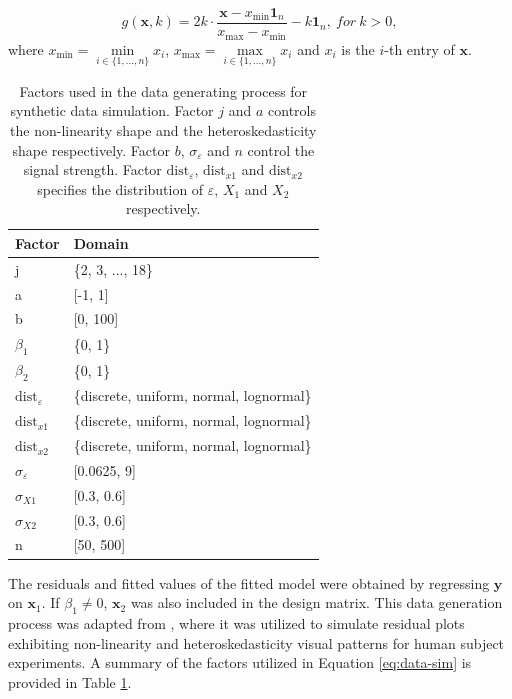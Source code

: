 \documentclass[]{interact}
\theoremstyle{plain}%
\theoremstyle{definition}
\theoremstyle{remark}
\begin{document}
\[g(\boldsymbol{x}, k) = 2k \cdot \frac{\boldsymbol{x} - x_{\min}\boldsymbol{1}_n}{x_{\max} - x_{\min}} - k\boldsymbol{1}_n,~for~k > 0,\]
\noindent where \(x_{\min} = \underset{i \in \{ 1,...,n\}}{\min} x_i\),
\(x_{\max} = \underset{i \in \{ 1,...,n\}}{\max} x_i\) and \(x_i\) is
the \(i\)-th entry of \(\boldsymbol{x}\).

\begin{table}

\caption{\label{tab:factor}Factors used in the data generating process for synthetic data simulation. Factor $j$ and $a$ controls the non-linearity shape and the heteroskedasticity shape respectively. Factor $b$, $\sigma_\varepsilon$ and $n$ control the signal strength. Factor $\text{dist}_\varepsilon$, $\text{dist}_{x1}$ and $\text{dist}_{x2}$ specifies the distribution of $\varepsilon$, $X_1$ and $X_2$ respectively.}
\centering
\begin{tabular}[t]{ll}
\toprule
Factor & Domain\\
\midrule
j & \{2, 3, ..., 18\}\\
a & {}[-1, 1]\\
b & {}[0, 100]\\
$\beta_1$ & \{0, 1\}\\
$\beta_2$ & \{0, 1\}\\
\addlinespace
$\text{dist}_\varepsilon$ & \{discrete, uniform, normal, lognormal\}\\
$\text{dist}_{x1}$ & \{discrete, uniform, normal, lognormal\}\\
$\text{dist}_{x2}$ & \{discrete, uniform, normal, lognormal\}\\
$\sigma_{\varepsilon}$ & {}[0.0625, 9]\\
$\sigma_{X1}$ & {}[0.3, 0.6]\\
\addlinespace
$\sigma_{X2}$ & {}[0.3, 0.6]\\
n & {}[50, 500]\\
\bottomrule
\end{tabular}
\end{table}

The residuals and fitted values of the fitted model were obtained by
regressing \(\boldsymbol{y}\) on \(\boldsymbol{x}_1\). If
\(\beta_1 \neq 0\), \(\boldsymbol{x}_2\) was also included in the design
matrix. This data generation process was adapted from
\citet{li2024plot}, where it was utilized to simulate residual plots
exhibiting non-linearity and heteroskedasticity visual patterns for
human subject experiments. A summary of the factors utilized in Equation
\ref{eq:data-sim} is provided in Table \ref{tab:factor}.
\end{document}
